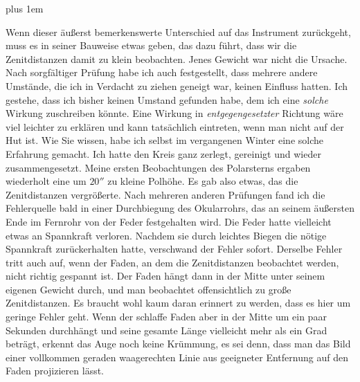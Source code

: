 {\rightskip=0pt plus 1em \par\indent Wenn dieser äußerst bemerkenswerte Unterschied auf das Instrument zurückgeht, muss es in seiner Bauweise etwas geben, das dazu führt, dass wir die Zenitdistanzen damit zu klein beobachten. Jenes Gewicht war nicht die Ursache. Nach sorgfältiger Prüfung habe ich auch festgestellt, dass mehrere andere Umstände, die ich in Verdacht zu ziehen geneigt war, keinen Einfluss hatten. Ich gestehe, dass ich bisher keinen Umstand gefunden habe, dem ich eine \emph{solche} Wirkung zuschreiben könnte. Eine Wirkung in \emph{entgegengesetzter} Richtung wäre viel leichter zu erklären und kann tatsächlich eintreten, wenn man nicht auf der Hut ist. Wie Sie wissen, habe ich selbst im vergangenen Winter eine solche Erfahrung gemacht. Ich hatte den Kreis ganz zerlegt, gereinigt und wieder zusammengesetzt. Meine ersten Beobachtungen des Polarsterns ergaben wiederholt eine um $20''$ zu kleine Polhöhe. Es gab also etwas, das die Zenitdistanzen vergrößerte. Nach mehreren anderen Prüfungen fand ich die Fehlerquelle bald in einer Durchbiegung des Okularrohrs, das an seinem äußersten Ende im Fernrohr von der Feder  festgehalten wird. Die Feder hatte vielleicht etwas an Spannkraft verloren. Nachdem sie durch leichtes Biegen die nötige Spannkraft zurückerhalten hatte, verschwand der Fehler sofort. Derselbe Fehler tritt auch auf, wenn der Faden, an dem die Zenitdistanzen beobachtet werden, nicht richtig gespannt ist. Der Faden hängt dann in der Mitte unter seinem eigenen Gewicht durch, und man beobachtet offensichtlich zu große Zenitdistanzen. Es braucht wohl kaum daran erinnert zu werden, dass es hier um geringe Fehler geht. Wenn der schlaffe Faden aber in der Mitte um ein paar Sekunden durchhängt und seine gesamte Länge vielleicht mehr als ein Grad beträgt, erkennt das Auge noch keine Krümmung, es sei denn, dass man das Bild einer vollkommen geraden waagerechten Linie aus geeigneter Entfernung auf den Faden projizieren lässt.\par}

